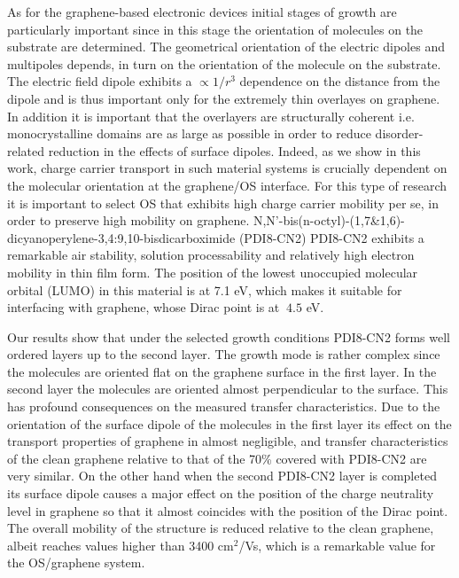 \documentclass[preprint,aip,jap]{revtex4-2}
\begin{document}
As for the graphene-based electronic devices initial stages of growth are particularly important since in this stage the orientation of molecules on the substrate are determined. The geometrical orientation of the electric dipoles and multipoles depends, in turn on the orientation of the molecule on the substrate\cite{geng-2012}. The electric field dipole exhibits a $\propto 1/r^{3}$ dependence on the distance from the dipole and is thus important only for the extremely thin overlayes on graphene. In addition it is important that the overlayers are structurally coherent i.e. monocrystalline domains are as large as possible in order to reduce disorder-related reduction in the effects of surface dipoles. Indeed, as  we show in this work, charge carrier transport in such material systems is crucially dependent on the molecular orientation at the graphene/OS interface. For this type of research it is important to select OS that exhibits high charge carrier mobility per se, in order to preserve high mobility on graphene.   N,N'-bis(n-octyl)-(1,7\&1,6)-dicyanoperylene-3,4:9,10-bisdicarboximide (PDI8-CN2)
PDI8-CN2 exhibits a remarkable air stability, solution processability and relatively high electron mobility in thin film form\cite{jung-2014,molinari-2009,piliego-2009a}.  The position of the lowest unoccupied molecular orbital (LUMO) in this material is at 7.1 eV\cite{jung-2014}, which makes it suitable for interfacing with graphene, whose Dirac point is at $~4.5$ eV.

Our results show that under the selected growth conditions PDI8-CN2 forms well ordered layers up to the second layer. The growth mode is rather complex since the molecules are oriented flat on the graphene surface in the first layer. In the second layer the molecules are oriented almost perpendicular to the surface. This has profound consequences on the measured transfer characteristics. Due to the orientation of the surface dipole of the molecules in the first layer its effect on the transport properties of graphene in almost negligible, and transfer characteristics of the clean graphene relative to that of the 70\% covered with PDI8-CN2 are very similar. On the other hand when the second PDI8-CN2 layer is completed its surface dipole causes a major effect on the position of the charge neutrality level in graphene so that it almost coincides with the position of the Dirac point.  The overall mobility of the structure is reduced relative to the clean graphene, albeit reaches values higher than 3400 cm$^{2}$/Vs, which is a remarkable value for the OS/graphene system. 
\end{document}
